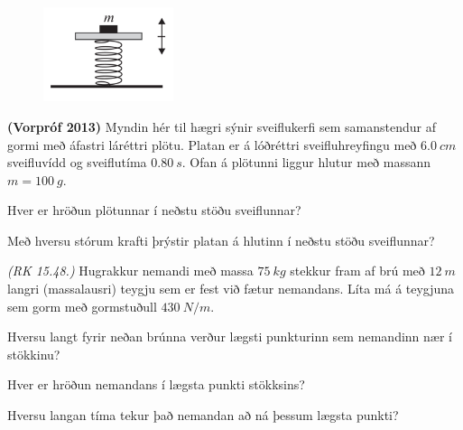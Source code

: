 \ifdefined \wholebook \else\documentclass[oneside]{book}\usepackage{EdlBook}\graphicspath{{figures/}}
\begin{document}
\begin{enumerate}[label = \textbf{Dæmi \thechapter.\arabic*.}]
\begin{minipage}{\linewidth}

\begin{figure}
\vspace{-0.5cm}
\includegraphics[width = 1.5in]{images/vorprof2013.png}
\end{figure}

\item \textbf{(Vorpróf 2013)} Myndin hér til hægri sýnir sveiflukerfi sem samanstendur af gormi með áfastri láréttri plötu. Platan er á lóðréttri sveifluhreyfingu með $\SI{6.0}{cm}$ sveifluvídd og sveiflutíma $\SI{0.80}{s}$. Ofan á plötunni liggur hlutur með massann $m = \SI{100}{g}$.
\begin{enumerate*}[label = \textbf{(\alph*)}]
    \item Hver er hröðun plötunnar í neðstu stöðu sveiflunnar?
    \item Með hversu stórum krafti þrýstir platan á hlutinn í neðstu stöðu sveiflunnar?
\end{enumerate*}
\end{minipage}

\vspace{0.2cm}

\item \textit{(RK 15.48.)} Hugrakkur nemandi með massa $\SI{75}{kg}$ stekkur fram af brú með $\SI{12}{m}$ langri (massalausri) teygju sem er fest við fætur nemandans. Líta má á teygjuna sem gorm með gormstuðull $\SI{430}{N/m}$.
\begin{enumerate*}[label = \textbf{(\alph*)}]
    \item Hversu langt fyrir neðan brúnna verður lægsti punkturinn sem nemandinn nær í stökkinu?
    \item Hver er hröðun nemandans í lægsta punkti stökksins?
    \item Hversu langan tíma tekur það nemandan að ná þessum lægsta punkti?
\end{enumerate*}

\end{enumerate}
\end{document}
